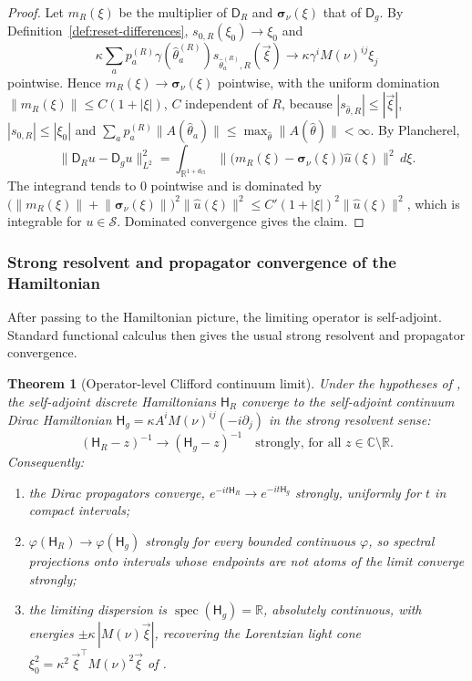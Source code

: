 \documentclass[11pt]{article}
\newtheorem{theorem}{Theorem}[section]
\theoremstyle{definition}
\theoremstyle{remark}
\newcommand{\R}{\mathbb{R}}
\newcommand{\C}{\mathbb{C}}
\newcommand{\dCl}{d_{\mathrm{Cl}}}
\newcommand{\spec}{\operatorname{spec}}
\newcommand{\sym}{\boldsymbol{\sigma}}
\newcommand{\Sch}{\mathcal{S}}
\newcommand{\Dirac}{\mathsf{D}}
\newcommand{\Ham}{\mathsf{H}}
\newcommand{\norm}[1]{\lVert#1\rVert}
\begin{document}
\begin{proof}
Let $m_R(\xi)$ be the multiplier of $\Dirac_R$ and $\sym_\nu(\xi)$ that of
$\Dirac_g$.  By Definition~\ref{def:reset-differences}, $s_{0,R}(\xi_0)\to\xi_0$ and
\[
  \kappa\sum_a p_a^{(R)}\gamma(\hat\theta_a^{(R)})
  s_{\hat\theta_a^{(R)},R}(\vec\xi)
  \longrightarrow
  \kappa\gamma^iM(\nu)^{ij}\xi_j
\]
pointwise.  Hence $m_R(\xi)\to\sym_\nu(\xi)$
pointwise, with the uniform domination
$\norm{m_R(\xi)}\le C(1+|\xi|)$, $C$ independent of $R$, because
$|s_{\hat\theta,R}|\le|\vec\xi|$, $|s_{0,R}|\le|\xi_0|$ and
$\sum_a p_a^{(R)}\norm{A(\hat\theta_a)}\le\max_{\hat\theta}\norm{A(\hat\theta)}
<\infty$.  By Plancherel,
\[
  \norm{\Dirac_R u-\Dirac_g u}_{L^2}^2
  =\int_{\R^{1+\dCl}}\norm{\bigl(m_R(\xi)-\sym_\nu(\xi)\bigr)\hat u(\xi)}^2\,d\xi .
\]
The integrand tends to $0$ pointwise and is dominated by
$\bigl(\norm{m_R(\xi)}+\norm{\sym_\nu(\xi)}\bigr)^2\norm{\hat u(\xi)}^2
\le C'(1+|\xi|)^2\norm{\hat u(\xi)}^2$, which is integrable for
$u\in\Sch$.  Dominated convergence gives the claim.
\end{proof}

\subsubsection{Strong resolvent and propagator convergence of the Hamiltonian}

After passing to the Hamiltonian picture, the limiting operator is
self-adjoint.  Standard functional calculus then gives the usual strong
resolvent and propagator convergence.

\begin{theorem}[Operator-level Clifford continuum limit]
\label{thm:operator-limit}
Under the hypotheses of , the self-adjoint discrete
Hamiltonians $\Ham_R$ converge to the self-adjoint continuum Dirac Hamiltonian
$\Ham_g=\kappa A^iM(\nu)^{ij}(-i\partial_j)$ in the strong resolvent sense:
\[
  (\Ham_R-z)^{-1}\longrightarrow(\Ham_g-z)^{-1}\quad\text{strongly, for all }
  z\in\C\setminus\R .
\]
Consequently:
\begin{enumerate}[label=\textup{(\roman*)},leftmargin=2.2em]
\item the Dirac propagators converge, $e^{-it\Ham_R}\to e^{-it\Ham_g}$ strongly,
      uniformly for $t$ in compact intervals;
\item $\varphi(\Ham_R)\to\varphi(\Ham_g)$ strongly for every bounded continuous
      $\varphi$, so spectral projections onto intervals whose endpoints are not
      atoms of the limit converge strongly;
\item the limiting dispersion is $\spec(\Ham_g)=\R$, absolutely continuous, with
      energies $\pm\kappa\,|M(\nu)\vec\xi|$, recovering the Lorentzian light cone
      $\xi_0^2=\kappa^2\,\vec\xi^{\top}M(\nu)^2\vec\xi$ of
      .
\end{enumerate}
\end{theorem}
\end{document}
